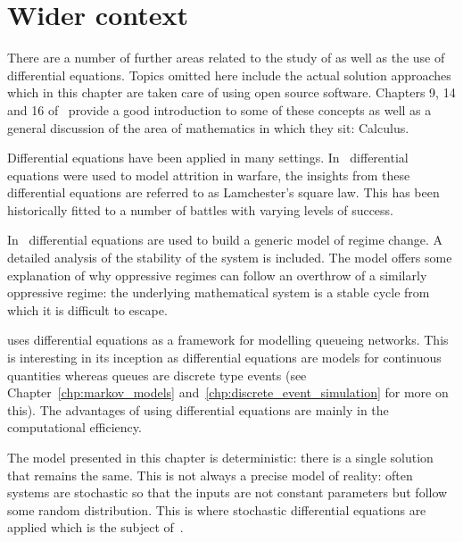 \section{Wider context}\label{sec:differential_equations_wider_context}

There are a number of further areas related to the study of as well as the use
of differential equations. Topics omitted here include the actual solution
approaches which in this chapter are taken
care of using open source software. Chapters 9, 14 and 16
of~\parencite{stewart2009probability} provide a good introduction to some of
these concepts as well as a general discussion of the area of mathematics in
which they sit: Calculus.

Differential equations have been applied in many settings.
In~\parencite{lanchester1916aircraft} differential equations were used to model
attrition in warfare, the insights from these differential equations are
referred to as Lamchester's square law. This has been historically fitted to a
number of battles with varying levels of success.

In~\parencite{syms2015dynamic} differential equations are used to build a
generic model of regime change. A detailed analysis of the stability of the
system is included. The model offers some explanation of why oppressive regimes
can follow an overthrow of a similarly oppressive regime: the underlying
mathematical system is a stable cycle from which it is difficult to escape.

\parencite{vandergraft1983fluid} uses differential equations as a framework for
modelling queueing networks. This is interesting in its inception as
differential equations are models for continuous quantities whereas queues are
discrete type events (see Chapter~\ref{chp:markov_models}
and~\ref{chp:discrete_event_simulation} for more on this). The advantages of
using differential equations are mainly in the computational efficiency.

The model presented in this chapter is deterministic: there is a single solution
that remains the same. This is not always a precise model of reality: often
systems are stochastic so that the inputs are not constant parameters but follow
some random distribution. This is where stochastic differential equations are
applied which is the subject of~\parencite{sarkka2019applied}.
